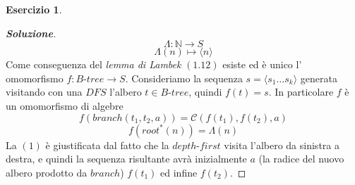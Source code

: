 \documentclass{article}
\theoremstyle{definition}
\newtheorem{esercizio}{Esercizio}
\theoremstyle{definition}
\theoremstyle{definition}
\theoremstyle{remark}
\begin{document}
\begin{esercizio}
\begin{proof}[\textbf{Soluzione}]
        $$\Lambda : \mathbb{N}\to S$$
        $$\Lambda(n)\mapsto \langle n\rangle$$
        Come conseguenza del \textit{lemma di Lambek} $(1.12)$ esiste  ed è unico l' omomorfismo $f:B\text{-}tree\to S$.
        Consideriamo la sequenza $s = \langle s_1\dots s_k\rangle$ generata visitando con una $DFS$ l'albero $t\in B\text{-}tree$,
        quindi $f(t) = s$. In particolare $f$ è un omomorfismo di algebre
        \begin{equation}
            f(branch(t_1,t_2,a)) = \mathcal{C}(f(t_1),f(t_2),a)
        \end{equation}
        \begin{equation}
            f(root^*(n)) = \Lambda(n)
        \end{equation}
        La $(1)$ è giustificata dal fatto che la  $depth$-$first$ visita l'albero  da  sinistra a destra, e quindi la sequenza
        risultante avrà inizialmente $a$ (la radice del nuovo albero prodotto da $branch$) $f(t_1)$  ed infine $f(t_2)$.
    \end{proof}
\end{esercizio}
\end{document}
